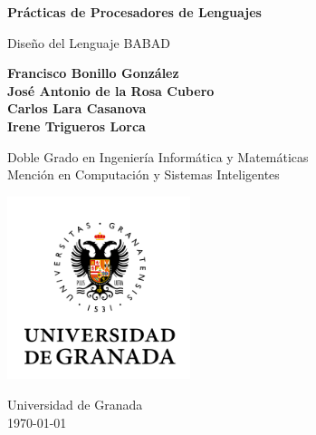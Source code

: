 \begin{titlepage}
   \begin{center}
       \vspace*{1cm}

       {\LARGE\textbf{Prácticas de Procesadores de Lenguajes}}

       \vspace{0.5cm}
        {\Large Diseño del Lenguaje BABAD}

       \vspace{1.5cm}

       \textbf{
           Francisco Bonillo González\\
           José Antonio de la Rosa Cubero\\
           Carlos Lara Casanova\\
           Irene Trigueros Lorca
       }

       \vfill

       Doble Grado en Ingeniería Informática y Matemáticas\\
       Mención en Computación y Sistemas Inteligentes

       \vspace{0.8cm}

       \includegraphics[width=0.4\textwidth]{university.png}

       Universidad de Granada\\
           \today{}\\

   \end{center}
\end{titlepage}
